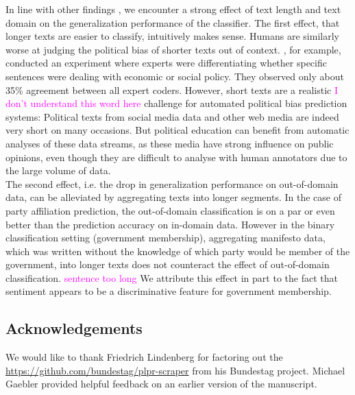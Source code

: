 \documentclass[11pt]{article}
\newcommand{\ssc}[1]{\textcolor{magenta}{#1}}
\begin{document}
In line with other findings \cite{Yu2008, Hirst2014}, we encounter a strong effect of text length and text domain on the generalization performance of the classifier. The first effect, that longer texts are easier to classify, intuitively makes sense. Humans are similarly worse at judging the political bias of shorter texts out of context. \cite{Benoit.Forthcoming}, for example, conducted an experiment where experts were differentiating whether specific sentences were dealing with economic or social policy. They observed only about 35\% agreement between all expert coders. However, short texts are a realistic \ssc{I don't understand this word here} challenge for automated political bias prediction systems: Political texts from social media data and other web media are indeed very short on many occasions. But political education can benefit from automatic analyses of these data streams, as these media have strong influence on public opinions, even though they are difficult to analyse with human annotators due to the large volume of data. \\
The second effect, i.e. the drop in generalization performance on out-of-domain data, can be alleviated by aggregating texts into longer segments. In the case of party affiliation prediction, the out-of-domain classification is on a par or even better than the prediction accuracy on in-domain data. However in the binary classification setting (government membership), aggregating manifesto data, which was written without the knowledge of which party would be member of the government, into longer texts does not counteract the effect of out-of-domain classification. \ssc{sentence too long} We attribute this effect in part to the fact that sentiment appears to be a discriminative feature for government membership. 

\subsection*{Acknowledgements}
We would like to thank Friedrich Lindenberg for factoring out the \url{https://github.com/bundestag/plpr-scraper} from his Bundestag project. Michael Gaebler provided helpful feedback on an earlier version of the manuscript. \\
%


\end{document}

